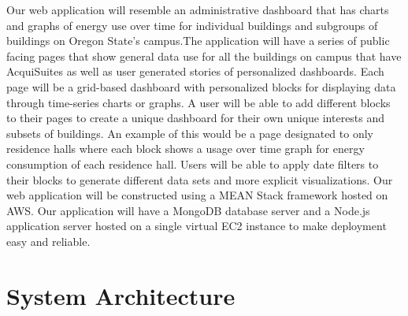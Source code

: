 \documentclass[journal,10pt,onecolumn,compsoc]{IEEEtran}
\begin{document}
    \noindent Our web application will resemble an administrative dashboard that has charts and graphs of energy use over time for individual buildings and subgroups of buildings on Oregon State's campus.The application will have a series of public facing pages that show general data use for all the buildings on campus that have AcquiSuites as well as user generated stories of personalized dashboards. Each page will be a grid-based dashboard with personalized blocks for displaying data through time-series charts or graphs. A user will be able to add different blocks to their pages to create a unique dashboard for their own unique interests and subsets of buildings. An example of this would be a page designated to only residence halls where each block shows a usage over time graph for energy consumption of each residence hall. Users will be able to apply date filters to their blocks to generate different data sets and more explicit visualizations. 
    \noindent Our web application will be constructed using a MEAN Stack framework hosted on AWS. Our application will have a MongoDB database server and a Node.js application server hosted on a single virtual EC2 instance to make deployment easy and reliable.
    \section{System Architecture}
\end{document}
